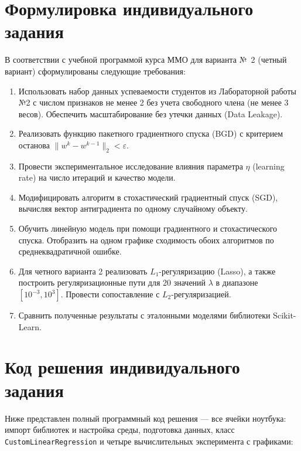 \documentclass[14pt,a4paper]{extarticle}
\begin{document}
\section{Формулировка индивидуального задания}
В соответствии с учебной программой курса ММО для варианта №~2 (четный вариант) сформулированы следующие требования:
\begin{enumerate}
    \item Использовать набор данных успеваемости студентов из Лабораторной работы №2 с числом признаков не менее 2 без учета свободного члена (не менее 3 весов). Обеспечить масштабирование без утечки данных (Data Leakage).
    \item Реализовать функцию пакетного градиентного спуска (BGD) с критерием останова $\|w^k - w^{k-1}\|_2 < \varepsilon$.
    \item Провести экспериментальное исследование влияния параметра $\eta$ (learning rate) на число итераций и качество модели.
    \item Модифицировать алгоритм в стохастический градиентный спуск (SGD), вычисляя вектор антиградиента по одному случайному объекту.
    \item Обучить линейную модель при помощи градиентного и стохастического спуска. Отобразить на одном графике сходимость обоих алгоритмов по среднеквадратичной ошибке.
    \item Для четного варианта 2 реализовать $L_1$-регуляризацию (Lasso), а также построить регуляризационные пути для 20 значений $\lambda$ в диапазоне $[10^{-3}, 10^3]$. Провести сопоставление с $L_2$-регуляризацией.
    \item Сравнить полученные результаты с эталонными моделями библиотеки Scikit-Learn.
\end{enumerate}

\section{Код решения индивидуального задания}
Ниже представлен полный программный код решения — все ячейки ноутбука: импорт библиотек и настройка среды, подготовка данных, класс \texttt{CustomLinearRegression} и четыре вычислительных эксперимента с графиками:
\end{document}
